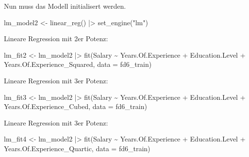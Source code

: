 \documentclass[
  letterpaper,
  DIV=11,
  numbers=noendperiod]{scrartcl}
\newenvironment{Shaded}{\begin{snugshade}}{\end{snugshade}}
\newcommand{\AttributeTok}[1]{\textcolor[rgb]{0.40,0.45,0.13}{#1}}
\newcommand{\FunctionTok}[1]{\textcolor[rgb]{0.28,0.35,0.67}{#1}}
\newcommand{\NormalTok}[1]{\textcolor[rgb]{0.00,0.23,0.31}{#1}}
\newcommand{\OtherTok}[1]{\textcolor[rgb]{0.00,0.23,0.31}{#1}}
\newcommand{\SpecialCharTok}[1]{\textcolor[rgb]{0.37,0.37,0.37}{#1}}
\newcommand{\StringTok}[1]{\textcolor[rgb]{0.13,0.47,0.30}{#1}}
\begin{document}
Nun muss das Modell initialisert werden.

\begin{Shaded}
\begin{Highlighting}[]
\NormalTok{lm\_model2 }\OtherTok{\textless{}{-}} \FunctionTok{linear\_reg}\NormalTok{() }\SpecialCharTok{|\textgreater{}} \FunctionTok{set\_engine}\NormalTok{(}\StringTok{"lm"}\NormalTok{)}
\end{Highlighting}
\end{Shaded}

Lineare Regression mit 2er Potenz:

\begin{Shaded}
\begin{Highlighting}[]
\NormalTok{lm\_fit2 }\OtherTok{\textless{}{-}}\NormalTok{ lm\_model2 }\SpecialCharTok{|\textgreater{}} \FunctionTok{fit}\NormalTok{(Salary }\SpecialCharTok{\textasciitilde{}}\NormalTok{ Years.Of.Experience }\SpecialCharTok{+}\NormalTok{ Education.Level }\SpecialCharTok{+}\NormalTok{ Years.Of.Experience\_Squared, }\AttributeTok{data =}\NormalTok{ fd6\_train)}
\end{Highlighting}
\end{Shaded}

Lineare Regression mit 3er Potenz:

\begin{Shaded}
\begin{Highlighting}[]
\NormalTok{lm\_fit3 }\OtherTok{\textless{}{-}}\NormalTok{ lm\_model2 }\SpecialCharTok{|\textgreater{}} \FunctionTok{fit}\NormalTok{(Salary }\SpecialCharTok{\textasciitilde{}}\NormalTok{ Years.Of.Experience }\SpecialCharTok{+}\NormalTok{ Education.Level }\SpecialCharTok{+}\NormalTok{ Years.Of.Experience\_Cubed, }\AttributeTok{data =}\NormalTok{ fd6\_train)}
\end{Highlighting}
\end{Shaded}

Lineare Regression mit 3er Potenz:

\begin{Shaded}
\begin{Highlighting}[]
\NormalTok{lm\_fit4 }\OtherTok{\textless{}{-}}\NormalTok{ lm\_model2 }\SpecialCharTok{|\textgreater{}} \FunctionTok{fit}\NormalTok{(Salary }\SpecialCharTok{\textasciitilde{}}\NormalTok{ Years.Of.Experience }\SpecialCharTok{+}\NormalTok{ Education.Level }\SpecialCharTok{+}\NormalTok{ Years.Of.Experience\_Quartic, }\AttributeTok{data =}\NormalTok{ fd6\_train)}
\end{Highlighting}
\end{Shaded}
\end{document}
